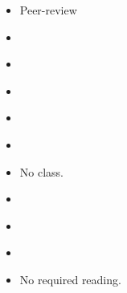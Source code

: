 \documentclass{article}
\begin{document}
\dia{}
\begin{itemize}
\item Peer-review
\end{itemize}

\dia{}
\begin{itemize}
\item {}
\end{itemize}

\dia{}
\begin{itemize}
\item {}
\end{itemize}

\dia{}
\begin{itemize}
\item {}
\end{itemize}

\dia{}
\begin{itemize}
\item {}
\end{itemize}


\dia{}
\begin{itemize}
\item {}
\end{itemize}

\dia{}
\begin{itemize}
\item No class. %
\end{itemize}

\week{}
\dia{}\SpringBreak{}
\dia{}\SpringBreak{}

\dia{}
\begin{itemize}
\item {}
\end{itemize}

\dia{}
\begin{itemize}
\item {}
\end{itemize}


\dia{}
\begin{itemize}
\item {}
\end{itemize}

\dia{}
\begin{itemize}
\item No required reading.
\end{itemize}
\end{document}
